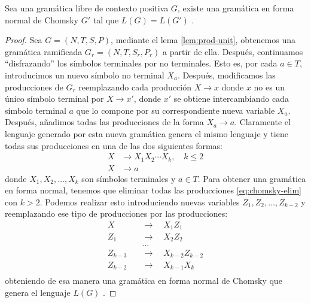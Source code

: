 \begin{lema}Sea una gramática libre de contexto positiva $G$, existe una gramática en forma normal de Chomsky $G'$ tal 
que $L(G)=L(G')$ \cite{davis_sigal_weyuker_1994}.    
\end{lema}
\begin{proof}
Sea $G=(N,T,S,P)$, mediante el lema \ref{lem:prod-unit}, obtenemos una gramática ramificada $G_r=(N,T,S_r,P_r)$ a 
partir de ella. Después, continuamos ``disfrazando'' los símbolos terminales por no terminales. Esto es, por cada
$a\in T$, introducimos un nuevo símbolo no terminal $X_a$. Después, modificamos las producciones de $G_r$ reemplazando
cada producción $X\to x$ donde $x$ no es un único símbolo terminal por $X\to x'$, donde $x'$ se obtiene intercambiando
cada símbolo terminal $a$ que lo compone por su correspondiente nueva variable $X_a$. Después, añadimos todas las
producciones de la forma $X_a\to a$. Claramente el lenguaje generado por esta nueva gramática genera el mismo lenguaje
y tiene todas sus producciones en una de las dos siguientes formas:
\begin{align}
    X&\to X_1X_2\cdots X_k,\quad k\leq 2 \label{eq:chomsky-elim} \\
    X&\to a
\end{align}
donde $X_1,X_2,\dots,X_k$ son símbolos terminales y $a\in T$. Para obtener una gramática en forma normal, tenemos que
eliminar todas las producciones \eqref{eq:chomsky-elim} con $k>2$. Podemos realizar esto introduciendo nuevas variables
$Z_1,Z_2,\dots,Z_{k-2}$ y reemplazando ese tipo de producciones por las producciones:
\begin{align}
    X\quad&\to\quad X_1Z_1 \\
    Z_1\quad&\to\quad X_2Z_2 \\
    &\dotsc \\
    Z_{k-3}\quad&\to\quad X_{k-2}Z_{k-2} \\
     Z_{k-2}\quad&\to\quad X_{k-1}X_k \\
\end{align}
obteniendo de esa manera una gramática en forma normal de Chomsky que genera el lenguaje $L(G)$ 
\cite{davis_sigal_weyuker_1994}.
\end{proof}

